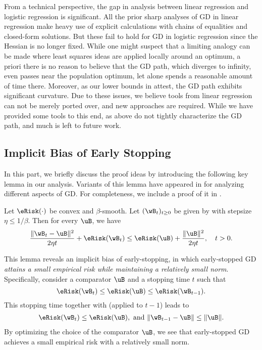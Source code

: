 \documentclass[11pt]{article}
\begin{document}
From a technical perspective, the gap in analysis between linear regression and logistic regression is significant.
All the prior sharp analyses of GD in linear regression make heavy use of explicit calculations with chains of equalities and closed-form solutions. 
But these fail to hold for GD in logistic regression since the Hessian is no longer fixed.
While one might suspect that a limiting analogy
can be made where least squares ideas are applied locally around an
optimum, a priori there is no reason to believe that the GD path,
which diverges to infinity, even passes near the population optimum,
let alone spends a reasonable amount of time there.  Moreover,
as our lower bounds in  attest, the GD path exhibits significant curvature.
Due to these issues, we believe tools from linear regression can not
be merely ported over, and new approaches are required.
While we have provided some tools to this end,
as above  do not tightly characterize
the GD path, and much is left to future work.



\subsection{Implicit Bias of Early Stopping}
In this part, we briefly discuss the proof ideas by introducing the following key lemma in our analysis.  
Variants of this lemma have appeared in \citep{ji2018risk,ji2019polylogarithmic,shamir2021gradient,telgarsky2022stochastic,wu2024large} for analyzing different aspects of GD. 
For completeness, we include a proof of it in .

\begin{lemma}\label{lemma:implicit-regularization}
Let $\eRisk(\cdot)$ be convex and $\beta$-smooth. Let $(\wB_t)_{t\ge 0}$ be given by  with stepsize $\eta \le 1/\beta$.
Then for every $\uB$, we have 
\begin{align*}
    \frac{\|\wB_t - \uB\|^2}{2\eta t} + \eRisk(\wB_t) \le \eRisk(\uB) + \frac{\|\uB\|^2}{2\eta t},\quad t>0.
\end{align*}
\end{lemma}
This lemma reveals an implicit bias of early-stopping, in which early-stopped GD \emph{attains a small empirical risk while maintaining a relatively small norm}. 
Specifically, consider a comparator $\uB$ and a stopping time $t$ such that 
\[
\eRisk(\wB_t)\le \eRisk(\uB) \le \eRisk(\wB_{t-1}).
\]
This stopping time together with  (applied to $t-1$) leads to
\begin{align*}
    \eRisk(\wB_t)\le \eRisk(\uB),\ \text{and}\ \|\wB_{t-1}- \uB\|\le \|\uB\|.
\end{align*}
By optimizing the choice of the comparator $\uB$, we see that early-stopped GD achieves a small empirical risk with a relatively small norm.
\end{document}
